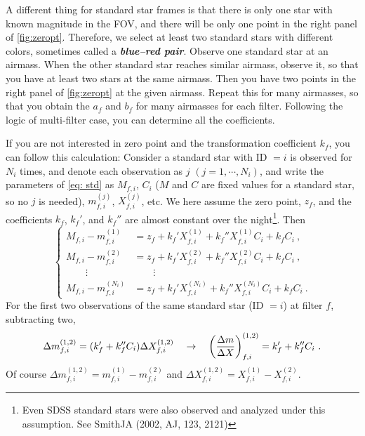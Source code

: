 A different thing for standard star frames is that there is only one star with known magnitude in the FOV, and there will be only one point in the right panel of \cref{fig:zeropt}. Therefore, we select at least two standard stars with different colors, sometimes called a \textbf{\emph{blue--red pair}}. Observe one standard star at an airmass. When the other standard star reaches similar airmass, observe it, so that you have at least two stars at the same airmass. Then you have two points in the right panel of \cref{fig:zeropt} at the given airmass. Repeat this for many airmasses, so that you obtain the $ a_f $ and $ b_f $ for many airmasses for each filter. Following the logic of multi-filter case, you can determine all the coefficients.

If you are not interested in zero point and the transformation coefficient $ k_f $, you can follow this calculation: Consider a standard star with ID $= i $ is observed for $ N_i $ times, and denote each observation as $ j $ $ (j = 1, \cdots, N_i) $, and write the parameters of \cref{eq: std} as $ M_{f, i} $, $ C_{i} $ ($ M $ and $ C $ are fixed values for a standard star, so no $ j $ is needed), $ m_{f, i}^{(j)} $, $ X_{f, i}^{(j)} $, etc. We here assume the zero point, $ z_f $, and the coefficients $ k_f $, $ k_f' $, and $ k_f'' $ are almost constant over the night\footnote{Even SDSS standard stars were also observed and analyzed under this assumption. See SmithJA (2002, AJ, 123, 2121)}. Then
\begin{equation}
\begin{cases}
  M_{f, i} - m_{f, i}^{(1)}
    &= z_f + k_f' X_{f, i}^{(1)} + k_f'' X_{f, i}^{(1)} C_{i} + k_f C_{i} ~, \\
  M_{f, i} - m_{f, i}^{(2)}
    &= z_f + k_f' X_{f, i}^{(2)} + k_f'' X_{f, i}^{(2)} C_{i} + k_f C_{i} ~, \\
  \qquad\vdots & \qquad\vdots \\
  M_{f, i} - m_{f, i}^{(N_i)}
    &= z_f + k_f' X_{f, i}^{(N_i)} + k_f'' X_{f, i}^{(N_i)} C_{i} + k_f C_{i}   ~.
\end{cases}
\end{equation}
For the first two observations of the same standard star (ID $= i $) at filter $ f $, subtracting two,
\begin{equation}
  \Delta m_{f, i}^{(1, 2)} 
    = (k_f' + k_f'' C_i) \Delta X_{f, i}^{(1, 2)} 
  \quad\rightarrow\quad
  \qty( \frac{\Delta m }{\Delta X} )_{f, i}^{(1, 2)}
    = k_f' + k_f'' C_i ~.
\end{equation}
Of course $ \Delta m_{f, i}^{(1, 2)}  = m_{f, i}^{(1)} - m_{f, i}^{(2)} $ and $ \Delta X_{f, i}^{(1, 2)}  = X_{f, i}^{(1)} - X_{f, i}^{(2)} $. 

